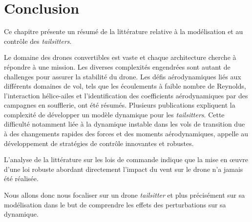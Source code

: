 \section{Conclusion}

Ce chapitre présente un résumé de la littérature relative à la modélisation et au contrôle des \textit{tailsitters}.

Le domaine des drones convertibles est vaste et chaque architecture cherche à répondre à une mission. Les diverses complexités engendrées sont autant de challenges pour assurer la stabilité du drone. Les défis aérodynamiques liés aux différents domaines de vol, tels que les écoulements à faible nombre de Reynolds, l'interaction hélice-ailes et l'identification des coefficients aérodynamiques par des campagnes en soufflerie, ont été résumés. Plusieurs publications expliquent la complexité de développer un modèle dynamique pour les \textit{tailsitters}. Cette difficulté notamment liée à la dynamique instable dans les vols de transition due à des changements rapides des forces et des moments aérodynamiques, appelle au développement de stratégies de contrôle innovantes et robustes. 

L'analyse de la littérature sur les lois de commande indique que la mise en œuvre d'une loi robuste abordant directement l'impact du vent sur le drone n'a jamais été réalisée.

Nous allons donc nous focaliser sur un drone \textit{tailsitter} et plus précisément sur sa modélisation dans le but de comprendre les effets des perturbations sur sa dynamique.
